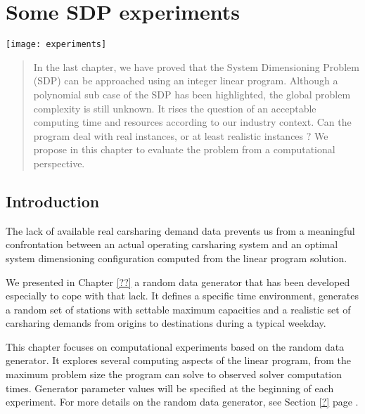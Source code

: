 \chapter{Some SDP experiments} \label{chap:sdpExp}
\begin{bibunit}[ieeetr]
\minitoc
\vspace{2cm}

\begin{minipage}[c]{0.3\linewidth}
\texttt{[image: experiments]}
\end{minipage}
\hfill
\begin{minipage}[c]{0.7\linewidth}
\begin{abstract}
In the last chapter, we have proved that the System Dimensioning Problem (SDP) can be approached using an integer linear program.
Although a polynomial sub case of the SDP has been highlighted, the global problem complexity is still unknown.
It rises the question of an acceptable computing time and resources according to our industry context.
Can the program deal with real instances, or at least realistic instances ?
We propose in this chapter to evaluate the problem from a computational perspective.
\end{abstract}
\end{minipage}

\newpage
\section{Introduction}
The lack of available real carsharing demand data prevents us from a meaningful confrontation between an actual operating carsharing system and an optimal system dimensioning configuration computed from the linear program solution.

\bigskip
We presented in Chapter \ref{??} a random data generator that has been developed especially to cope with that lack.
It defines a specific time environment, generates a random set of stations with settable maximum capacities and a realistic set of carsharing demands from origins to destinations during a typical weekday.

\bigskip
This chapter focuses on computational experiments based on the random data generator.
It explores several computing aspects of the linear program, from the maximum problem size the program can solve to observed solver computation times.
Generator parameter values will be specified at the beginning of each experiment.
For more details on the random data generator, see Section \ref{?} page \pageref{?}.


\end{bibunit}
